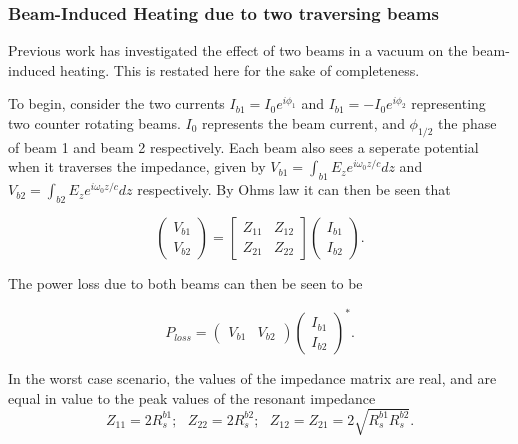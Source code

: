 \subsubsection{Beam-Induced Heating due to two traversing beams}

Previous work \cite{Grudiev:twoBeamCol} has investigated the effect of two beams in a vacuum on the beam-induced heating. This is restated here for the sake of completeness.

To begin, consider the two currents $I_{b1} = I_{0}e^{i\phi_{1}}$ and $I_{b1} = -I_{0}e^{i\phi_{2}}$ representing two counter rotating beams. $I_{0}$ represents the beam current, and $\phi_{1/2}$ the phase of beam 1 and beam 2 respectively. Each beam also sees a seperate potential when it traverses the impedance, given by $V_{b1} = \int_{b1} E_{z} e^{i\omega_{0}z/c} dz$ and $V_{b2} = \int_{b2} E_{z} e^{i\omega_{0}z/c} dz$ respectively. By Ohms law it can then be seen that

\begin{equation}
\begin{pmatrix}
V_{b1} \\
V_{b2}
\end{pmatrix}
=
\begin{bmatrix}
Z_{11} & Z_{12} \\
Z_{21} & Z_{22}
\end{bmatrix}
\begin{pmatrix}
I_{b1} \\
I_{b2}
\end{pmatrix}.
\end{equation}

The power loss due to both beams can then be seen to be

\begin{equation}
P_{loss} = \begin{pmatrix}
V_{b1} & V_{b2}
\end{pmatrix}
\begin{pmatrix}
I_{b1} \\
I_{b2}
\end{pmatrix}^{*}.
\end{equation}

In the worst case scenario, the values of the impedance matrix are real, and are equal in value to the peak values of the resonant impedance
\begin{equation}
Z_{11} = 2R^{b1}_{s};\text{    } Z_{22} = 2R^{b2}_{s};\text{    }  Z_{12} = Z_{21} = 2 \sqrt{R^{b1}_{s}R^{b2}_{s}}.
\end{equation}

